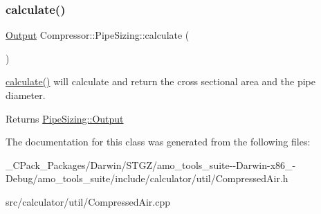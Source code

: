 \subsubsection{\texorpdfstring{calculate()}{calculate()}\hspace{0.1cm}{\footnotesize\ttfamily [3/3]}}
{\footnotesize\ttfamily \hyperlink{struct_compressor_1_1_pipe_sizing_1_1_output}{Output} Compressor\+::\+Pipe\+Sizing\+::calculate (\begin{DoxyParamCaption}{ }\end{DoxyParamCaption})}

\hyperlink{class_compressor_1_1_pipe_sizing_a9212c8d52ff658c412752cee18d6b28d}{calculate()} will calculate and return the cross sectional area and the pipe diameter. \begin{DoxyReturn}{Returns}
\hyperlink{struct_compressor_1_1_pipe_sizing_1_1_output}{Pipe\+Sizing\+::\+Output} 
\end{DoxyReturn}


The documentation for this class was generated from the following files\+:\begin{DoxyCompactItemize}
\item 
\+\_\+\+C\+Pack\+\_\+\+Packages/\+Darwin/\+S\+T\+G\+Z/amo\+\_\+tools\+\_\+suite-\/-\/\+Darwin-\/x86\+\_-\/\+Debug/amo\+\_\+tools\+\_\+suite/include/calculator/util/Compressed\+Air.\+h\item 
src/calculator/util/Compressed\+Air.\+cpp\end{DoxyCompactItemize}
